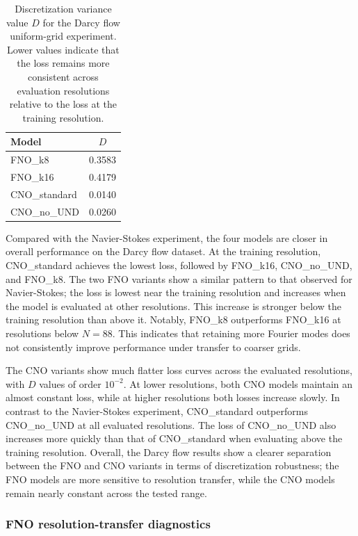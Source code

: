 \begin{table}
    \centering
    \caption{\label{tab:d-values-darcy-flow} Discretization variance value $D$ for the Darcy flow uniform-grid experiment. Lower values indicate that the loss remains more consistent across evaluation resolutions relative to the loss at the training resolution.}
    \begin{tabular}{lc}
        \hline
        Model & $D$ \\
        \hline
        FNO\_k8 & 0.3583 \\
        FNO\_k16 & 0.4179 \\
        CNO\_standard & 0.0140 \\
        CNO\_no\_UND & 0.0260 \\
        \hline
    \end{tabular}
\end{table}

Compared with the Navier-Stokes experiment, the four models are closer
in overall performance on the Darcy flow dataset. At the training
resolution, CNO\_standard achieves the lowest loss, followed by
FNO\_k16, CNO\_no\_UND, and FNO\_k8. The two FNO variants show a similar
pattern to that observed for Navier-Stokes; the loss is lowest near the
training resolution and increases when the model is evaluated at other
resolutions. This increase is stronger below the training resolution
than above it. Notably, FNO\_k8 outperforms FNO\_k16 at resolutions below $N = 88$. This indicates that
retaining more Fourier modes does not consistently improve performance
under transfer to coarser grids.

The CNO variants show much flatter loss curves across the evaluated
resolutions, with $D$ values of order \(10^{-2}\). At lower resolutions,
both CNO models maintain an almost constant loss, while at higher
resolutions both losses increase slowly. In contrast to the
Navier-Stokes experiment, CNO\_standard outperforms CNO\_no\_UND at all
evaluated resolutions. The loss of CNO\_no\_UND also increases more
quickly than that of CNO\_standard when evaluating above the training
resolution. Overall, the Darcy flow results show a clearer separation
between the FNO and CNO variants in terms of discretization robustness;
the FNO models are more sensitive to resolution transfer, while the CNO
models remain nearly constant across the tested range.


\subsubsection{FNO resolution-transfer diagnostics}\label{sec:fno_diagnostics}

